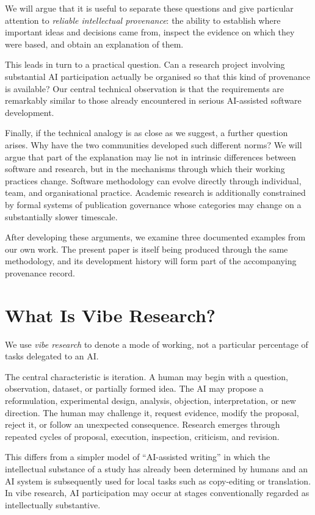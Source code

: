 We will argue that it is useful to separate these questions and give particular attention to \emph{reliable intellectual provenance}: the ability to establish where important ideas and decisions came from, inspect the evidence on which they were based, and obtain an explanation of them.

This leads in turn to a practical question. Can a research project involving substantial AI participation actually be organised so that this kind of provenance is available? Our central technical observation is that the requirements are remarkably similar to those already encountered in serious AI-assisted software development.

Finally, if the technical analogy is as close as we suggest, a further question arises. Why have the two communities developed such different norms? We will argue that part of the explanation may lie not in intrinsic differences between software and research, but in the mechanisms through which their working practices change. Software methodology can evolve directly through individual, team, and organisational practice. Academic research is additionally constrained by formal systems of publication governance whose categories may change on a substantially slower timescale.

After developing these arguments, we examine three documented examples from our own work. The present paper is itself being produced through the same methodology, and its development history will form part of the accompanying provenance record.


\section{What Is Vibe Research?}

We use \emph{vibe research} to denote a mode of working, not a particular percentage of tasks delegated to an AI.

The central characteristic is iteration. A human may begin with a question, observation, dataset, or partially formed idea. The AI may propose a reformulation, experimental design, analysis, objection, interpretation, or new direction. The human may challenge it, request evidence, modify the proposal, reject it, or follow an unexpected consequence. Research emerges through repeated cycles of proposal, execution, inspection, criticism, and revision.

This differs from a simpler model of ``AI-assisted writing'' in which the intellectual substance of a study has already been determined by humans and an AI system is subsequently used for local tasks such as copy-editing or translation. In vibe research, AI participation may occur at stages conventionally regarded as intellectually substantive.

